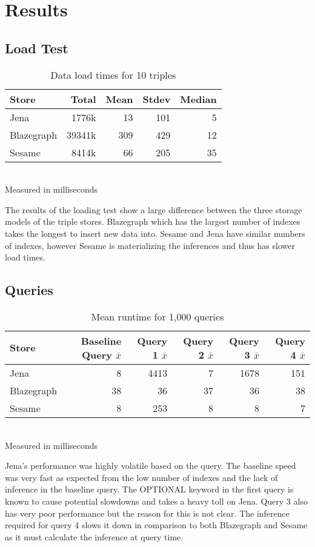 \documentclass{llncs}
\begin{document}
\section{Results}
\subsection{Load Test}
\begin{table}
\begin{center}
\caption{Data load times for 10 triples}
\begin{tabular}{l | r r r r }
Store & Total & Mean & Stdev & Median \\
\hline
Jena & 1776k & 13 & 101 & 5 \\
Blazegraph & 39341k & 309 & 429 & 12 \\
Sesame & 8414k & 66 & 205 & 35
\end{tabular}
\\[5pt]
Measured in milliseconds
\end{center}
\end{table}
The results of the loading test show a large difference between the three storage models of the triple stores.  Blazegraph which has the largest number of indexes takes the longest to insert new data into. Sesame and Jena have similar numbers of indexes, however Sesame is materializing the inferences and thus has slower load times.

\subsection{Queries}
\begin{table}
\begin{center}
\caption{Mean runtime for 1,000 queries}
\begin{tabular}{l | r r r r r}
    Store & Baseline Query $\overline{x}$ & Query 1 $\overline{x}$ & Query 2 $\overline{x}$ & Query 3 $\overline{x}$ & Query 4 $\overline{x}$ \\
\hline
Jena & 8 & 4413 & 7 & 1678 & 151 \\
Blazegraph & 38 & 36 & 37 & 36 & 38 \\
Sesame & 8 & 253 & 8 & 8 & 7
\end{tabular}
\\[5pt]
Measured in milliseconds
\end{center}
\end{table}

Jena's performance was highly volatile based on the query.  The baseline speed was very fast as expected from the low number of indexes and the lack of inference in the baseline query.  The OPTIONAL keyword in the first query is known to cause potential slowdowns and takes a heavy toll on Jena.  Query 3 also has very poor performance but the reason for this is not clear.  The inference required for query 4 slows it down in comparison to both Blazegraph and Sesame as it must calculate the inference at query time.
\end{document}
